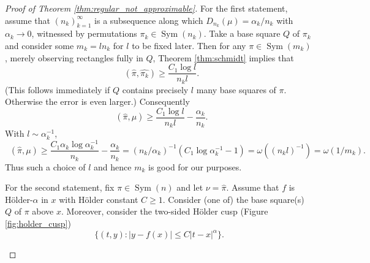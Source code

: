 \documentclass{article}
\newcommand{\Sym}{\mathop{\mathrm{Sym}}}
\newcommand{\ds}{\mathop{d_\square}}
\theoremstyle{definition}
\begin{document}
\begin{proof}[Proof of Theorem \ref{thm:regular_not_approximable}]
    For the first statement, assume that $(n_k)_{k=1}^{\infty}$ is a subsequence along which $D_{n_k}(\mu)=\alpha_k/n_k$ with $\alpha_k\to 0$, witnessed by permutations $\pi_k\in \Sym(n_k)$. Take a base square $Q$ of $\pi_k$ and consider some $m_k=ln_k$ for $l$ to be fixed later. Then for any $\pi\in \Sym(m_k)$, merely observing rectangles fully in $Q$, Theorem \ref{thm:schmidt} implies that
    $$\ds(\widehat{\pi}, \widehat{\pi_k})\geq \frac{C_1 \log l}{n_kl}.$$
    (This follows immediately if $Q$ contains precisely $l$ many base squares of $\pi$. Otherwise the error is even larger.)
    Consequently
    $$\ds(\widehat{\pi}, \mu)\geq \frac{C_1 \log l}{n_kl}-\frac{\alpha_k}{n_k}.$$
    With $l\sim \alpha_k^{-1}$,
    $$\ds(\widehat{\pi}, \mu)\geq \frac{C_1 \alpha_k\log \alpha_k^{-1}}{n_k}-\frac{\alpha_k}{n_k}=(n_k/\alpha_k)^{-1}(C_1\log \alpha_k^{-1}-1)=\omega((n_k l)^{-1})=\omega(1/m_k).$$
    Thus such a choice of $l$ and hence $m_k$ is good for our purposes.

    For the second statement, fix $\pi\in \Sym(n)$ and let $\nu = \widehat{\pi}$. Assume that $f$ is Hölder-$\alpha$ in $x$ with Hölder constant $C\geq 1$. Consider (one of) the base square(s) $Q$ of $\pi$ above $x$. Moreover, consider the two-sided Hölder cusp (Figure \ref{fig:holder_cusp})
\[
\{(t, y):|y-f(x)|\leq C|t-x|^\alpha\}.
\]

\begin{figure}[htb]\centering
{}
\end{figure}
\end{proof}
\end{document}
